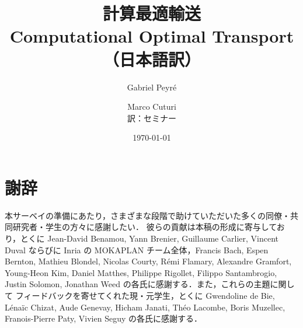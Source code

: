 \documentclass[uplatex, dvipdfmx, openany]{jsreport}
\title{計算最適輸送\\\large Computational Optimal Transport（日本語訳）}
\author{Gabriel Peyr\'e \and Marco Cuturi\\[1ex]\normalsize 訳：セミナー}
\date{\today}
\begin{document}
\maketitle



\tableofcontents












\chapter*{謝辞}
本サーベイの準備にあたり，さまざまな段階で助けていただいた多くの同僚・共同研究者・学生の方々に感謝したい．
彼らの貢献は本稿の形成に寄与しており，とくに Jean-David Benamou, Yann Brenier, Guillaume Carlier,
Vincent Duval ならびに Inria の MOKAPLAN チーム全体，Francis Bach, Espen Bernton, Mathieu Blondel,
Nicolas Courty, R\'emi Flamary, Alexandre Gramfort, Young-Heon Kim, Daniel Matthes, Philippe Rigollet,
Filippo Santambrogio, Justin Solomon, Jonathan Weed の各氏に感謝する．また，これらの主題に関して
フィードバックを寄せてくれた現・元学生，とくに Gwendoline de Bie, L\'ena\"ic Chizat, Aude Genevay,
Hicham Janati, Th\'eo Lacombe, Boris Muzellec, Franois-Pierre Paty, Vivien Seguy の各氏に感謝する．



\end{document}
